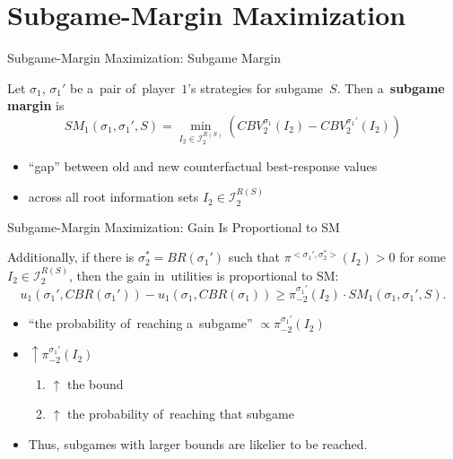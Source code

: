 \documentclass{beamer}
\theoremstyle{definition}
\newcommand{\I}{\mathcal{I}}
\begin{document}
  \section{Subgame-Margin Maximization}

  \begin{frame}{Subgame-Margin Maximization: Subgame Margin}
    \pause
    \begin{framed}
      Let $\sigma_1$, $\sigma_1'$ be a~pair of~player~$1$'s strategies for subgame~$S$.
      Then a~\textbf{subgame margin} is
      \[
        SM_1 (\sigma_1, \sigma_1' , S) =
        \min_{I_2 \in \I_2^{R(S)}}
        \left( CBV_2^{\sigma_1} (I_2) - CBV_2^{\sigma_1'} (I_2) \right)
      \]
    \end{framed}
    \pause

    \begin{itemize}[<+- | alert@+>]
      \item ``gap'' between old and new counterfactual best-response values
      \item across all root information sets $I_2 \in \I_2^{R(S)}$
    \end{itemize}
  \end{frame}

  \begin{frame}{Subgame-Margin Maximization: Gain Is Proportional to SM}
    \pause
    \begin{theorem}
      Additionally, if there is $\sigma_2^* = BR(\sigma_1')$ such that $\pi^{<\sigma_1',\sigma_2^*>} (I_2) > 0$ for some $I_2 \in\I_2^{R(S)}$, then the gain in~utilities is proportional to SM:
      \[
        u_1(\sigma_1', CBR(\sigma_1')) - u_1(\sigma_1, CBR(\sigma_1)) \ge \pi_{-2}^{\sigma_1'} (I_2) \cdot SM_1(\sigma_1, \sigma_1', S).
      \]
    \end{theorem}
    \pause

    \begin{itemize}[<+- | alert@+>]
       \item ``the probability of~reaching a~subgame'' $\propto \pi_{-2}^{\sigma_1'}(I_2)$
       \item $\uparrow \pi_{-2}^{\sigma_1'}(I_2)$
         \begin{enumerate}[$\Rightarrow$]
           \item $\uparrow$ the bound
           \item $\uparrow$ the probability of~reaching that subgame
         \end{enumerate}
       \item Thus, subgames with larger bounds are likelier to be reached.
    \end{itemize}
  \end{frame}
\end{document}
